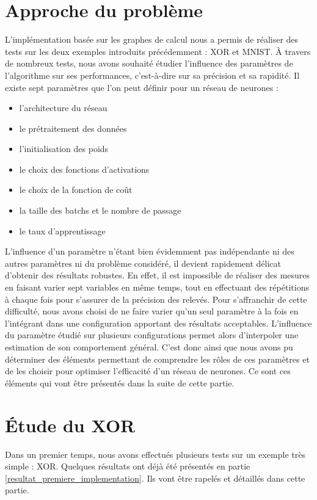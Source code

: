 \documentclass{report}
\begin{document}
\section{Approche du problème}

L'implémentation basée sur les graphes de calcul nous a permis de réaliser des tests sur les deux exemples introduits précédemment : XOR et MNIST. \`A travers de nombreux tests, nous avons souhaité étudier l'influence des paramètres de l'algorithme sur ses performances, c'est-à-dire sur sa précision et sa rapidité.
\medbreak
Il existe sept paramètres que l'on peut définir pour un réseau de neurones :
\begin{itemize}
\item l'architecture du réseau
\item le prétraitement des données
\item l'initialisation des poids
\item le choix des fonctions d'activations
\item le choix de la fonction de coût
\item la taille des batchs et le nombre de passage
\item le taux d'apprentissage
\end{itemize}
\medbreak
L'influence d'un paramètre n'étant bien évidemment pas indépendante ni des autres paramètres ni du problème considéré, il devient rapidement délicat d'obtenir des résultats robustes. En effet, il est impossible de réaliser des mesures en faisant varier sept variables en même temps, tout en effectuant des répétitions à chaque fois pour s'assurer de la précision des relevés. Pour s'affranchir de cette difficulté, nous avons choisi de ne faire varier qu'un seul paramètre à la fois en l'intégrant dans une configuration apportant des résultats acceptables. L'influence du paramètre étudié sur plusieurs configurations permet alors d'interpoler une estimation de son comportement général.
C'est donc ainsi que nous avons pu déterminer des éléments permettant de comprendre les rôles de ces paramètres et de les choisir pour optimiser l'efficacité d'un réseau de neurones. Ce sont ces éléments qui vont être présentés dans la suite de cette partie.

\section{\'Etude du XOR}

Dans un premier temps, nous avons effectués plusieurs tests sur un exemple très simple : XOR.
Quelques résultats ont déjà été présentés en partie \ref{resultat_premiere_implementation}. Ils vont être rapelés et détaillés dans cette partie.
\end{document}
